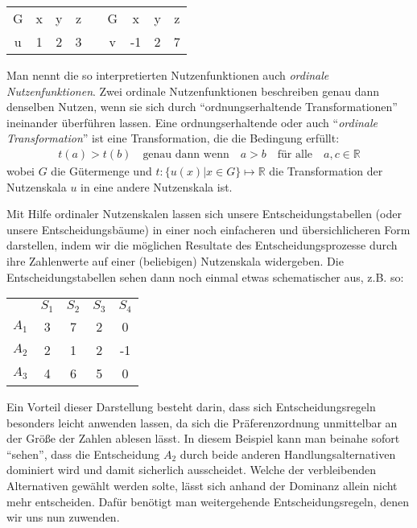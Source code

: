 \begin{center}
\begin{tabular}{c|c|c|ccc|c|c|c}
G & x & y & z & & G & x  & y & z \\ \cline{1-4} \cline{6-9}
u & 1 & 2 & 3 & & v & -1 & 2 & 7 \\
\end{tabular}
\end{center}

Man nennt die so interpretierten Nutzenfunktionen auch {\em ordinale
Nutzenfunktionen}. Zwei ordinale Nutzenfunktionen beschreiben genau dann
denselben Nutzen, wenn sie sich durch "`ordnungserhaltende Transformationen"'
ineinander überführen lassen. Eine ordnungserhaltende oder auch "`{\em ordinale
Transformation}"' ist eine Transformation, die die Bedingung erfüllt:
\begin{eqnarray}
t(a) > t(b) \quad\mbox{genau dann wenn}\quad a > b \quad\mbox{für alle}\quad a,
c \in \mathbb{R}
\end{eqnarray}
wobei $G$ die Gütermenge und $t: \{ u(x) | x \in G\} \mapsto \mathbb{R}$ die
Transformation der Nutzenskala $u$ in eine andere Nutzenskala ist.

Mit Hilfe ordinaler Nutzenskalen lassen sich unsere Entscheidungstabellen (oder
unsere Entscheidungsbäume) in einer noch einfacheren und übersichlicheren Form
darstellen, indem wir die möglichen Resultate des Entscheidungsprozesse durch
ihre Zahlenwerte auf einer (beliebigen) Nutzenskala widergeben. Die
Entscheidungstabellen sehen dann noch einmal etwas schematischer aus, z.B. so:

\begin{center}
\begin{tabular}{c|c|c|c|c|}
\multicolumn{1}{c}{ } & \multicolumn{1}{c}{$S_1$} &
\multicolumn{1}{c}{$S_2$} & \multicolumn{1}{c}{$S_3$} & 
\multicolumn{1}{c}{$S_4$} \\ \cline{2-5} 
$A_1$ &    3  &    7  &    2  &    0 \\ \cline{2-5} 
$A_2$ &    2  &    1  &    2  &   -1  \\ \cline{2-5}
$A_3$ &    4  &    6  &    5  &    0  \\ \cline{2-5}
\end{tabular}
\end{center}

Ein Vorteil dieser Darstellung besteht darin, dass sich Entscheidungs\-regeln
besonders leicht anwenden lassen, da sich die Präferenzordnung unmittelbar an
der Größe der Zahlen ablesen lässt. In diesem Beispiel kann man beinahe
sofort "`sehen"', dass die Entscheidung $A_2$ durch beide anderen
Handlungsalternativen dominiert wird und damit sicherlich ausscheidet. Welche
der verbleibenden Alternativen gewählt werden solte, lässt sich anhand der
Dominanz allein nicht mehr entscheiden. Dafür benötigt man weitergehende
Entscheidungsregeln, denen wir uns nun zuwenden.

